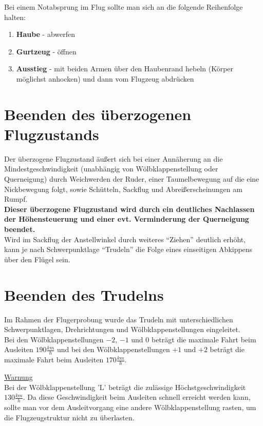 Bei einem Notabsprung im Flug sollte man sich an die folgende Reihenfolge halten: 
\begin{enumerate}
\item \textbf{Haube} - abwerfen
\item \textbf{Gurtzeug} - öffnen
\item \textbf{Ausstieg} - mit beiden Armen über den Haubenrand hebeln (Körper möglichst anhocken) und dann vom Flugzeug abdrücken
\end{enumerate}


\section{Beenden des überzogenen Flugzustands}
Der überzogene Flugzustand äußert sich bei einer Annäherung an die Mindestgeschwindigkeit (unabhängig von Wölbklappenstellung oder Querneigung) durch Weichwerden der Ruder, einer Taumelbewegung auf die eine Nickbewegung folgt, sowie Schütteln, Sackflug und Abreißerscheinungen am Rumpf.\\
\newline
\textbf{Dieser überzogene Flugzustand wird durch ein deutliches Nachlassen der Höhensteuerung und einer evt. Verminderung der Querneigung beendet.}\\
\newline
Wird im Sackflug der Anstellwinkel durch weiteres "`Ziehen"' deutlich erhöht, kann je nach Schwerpunktlage "`Trudeln"' die Folge eines einseitigen Abkippens über den Flügel sein.
\newpage
\section{Beenden des Trudelns}
Im Rahmen der Flugerprobung wurde das Trudeln mit unterschiedlichen Schwerpunktlagen, Drehrichtungen und Wölbklappenstellungen eingeleitet.\\
Bei den Wölbklappenstellungen \textbf{$-2$}, \textbf{$-1$} und \textbf{$0$} beträgt die maximale Fahrt beim Ausleiten \textbf{$190\frac{km}{h}$} und bei den Wölbklappenstellungen \textbf{$+1$} und \textbf{$+2$} beträgt die maximale Fahrt beim Ausleiten \textbf{$170\frac{km}{h}$}.
\newline
 
\underline{Warnung}\\
Bei der Wölbklappenstellung 'L' beträgt die zulässige Höchstgeschwindigkeit $130\frac{km}{h}$. Da diese Geschwindigkeit beim Ausleiten schnell erreicht werden kann, sollte man vor dem Ausleitvorgang eine andere Wölbklappenstellung rasten, um die Flugzeugstruktur nicht zu überlasten.\\


